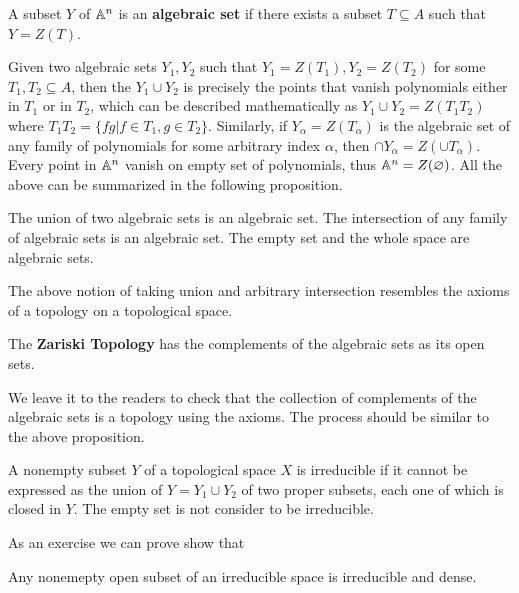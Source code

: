    \begin{definition}
   	A subset $Y$ of $\mathbb{A}^n$ is an \textbf{algebraic set} 
	if there exists a subset $T \subseteq A$ such that 
	$Y = Z(T)$. 	
   \end{definition}
   
   Given two algebraic sets $Y_1, Y_2$ such that 
   $Y_1 = Z(T_1), Y_2 = Z(T_2)$ for some $T_1, T_2 \subseteq A$,
   then the $Y_1 \cup Y_2$ is precisely the points that vanish 
   polynomials either in $T_1$ or in $T_2$,
   which can be described mathematically as 
   $Y_1 \cup Y_2 = Z(T_1 T_2)$
   where $T_1 T_2 = \{fg | f \in T_1, g \in T_2\}$.
   Similarly, if $Y_\alpha = Z(T_\alpha)$ is the algebraic set of 
   any family of polynomials for some arbitrary index $\alpha$,
   then $\cap Y_\alpha = Z(\cup T_\alpha)$. 
   Every point in $\mathbb{A}^n$ vanish on empty set of polynomials,
   thus $\mathbb{A}^n = Z(\varnothing)$. 
   All the above can be summarized in the following proposition.
   
   \begin{proposition}
   	The union of two algebraic sets is an algebraic set. 
	The intersection of any family of algebraic sets is an algebraic set.
	The empty set and the whole space are algebraic sets.
   \end{proposition}
   
   The above notion of taking union and arbitrary intersection 
   resembles the axioms of a topology on a topological space. 
   \begin{definition}
   	The \textbf{Zariski Topology} has the complements of the algebraic sets as its open sets. 
   \end{definition}
   We leave it to the readers to check that 
   the collection of complements of the algebraic sets is a topology 
   using the axioms. 
   The process should be similar to the above proposition. 
   
   \begin{definition}[Irreducible]
   	A nonempty subset $Y$ of a topological space $X$ is irreducible 
	if it cannot be expressed as the union of $Y = Y_1 \cup Y_2$
	of two proper subsets,
	each one of which is closed in $Y$.
	The empty set is not consider to be irreducible.
   \end{definition}
   
   As an exercise we can prove show that 
   \begin{proposition}
   	Any nonemepty open subset of an irreducible space is irreducible
	and dense. 
   \end{proposition}
   
